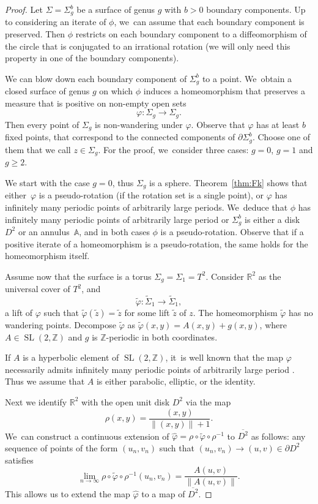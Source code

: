 \documentclass[JEP,XML,SOM,Unicode,NoEqCountersInSection,NoFloatCountersInSection,published]{cedram}
\DeclareMathOperator{\SL}{SL}
\theoremstyle{definition}
\begin{document}
\begin{proof}
Let $\Sigma=\Sigma_g^b$ be a surface of genus $g$ with $b>0$ boundary components. Up to considering an iterate of $\phi$, we~can assume that each boundary component is preserved. Then $\phi$ restricts on each boundary component to a diffeomorphism of the circle that is conjugated to an irrational rotation (we will only need this property in one of the boundary components).

We can blow down each boundary component of $\Sigma_g^b$ to a point. We~obtain a closed surface of genus $g$ on which $\phi$ induces a homeomorphism that preserves a measure that is positive on non-empty open sets
\[
\varphi: \Sigma_g \to \Sigma_g.
\]
Then every point of $\Sigma_g$ is non-wandering under $\varphi$.
Observe that $\varphi$ has at least $b$ fixed points, that correspond to the connected components of $\partial \Sigma_g^b$. Choose one of them that we call $z\in \Sigma_g$. For the proof, we~consider three cases: $g=0$, $g=1$ and $g\geq 2$.

We start with the case $g=0$, thus $\Sigma_g$ is a sphere. Theorem~\ref{thm:Fk} shows that either~$\varphi$ is a pseudo-rotation (if the rotation set is a single point), or $\varphi$ has infinitely many periodic points of arbitrarily large periods. We~deduce that $\phi$ has infinitely many periodic points of arbitrarily large period or $\Sigma_g^b$ is either a disk $D^2$ or an annulus~$\mathbb{A}$, and in both cases $\phi$ is a pseudo-rotation. Observe that if a positive iterate of a homeomorphism is a pseudo-rotation, the same holds for the homeomorphism itself.

Assume now that the surface is a torus $\Sigma_g=\Sigma_1=T^2$. Consider $\mathbb{R}^2$ as the universal cover of $T^2$, and
\[
\widetilde \varphi: \widetilde \Sigma_1 \to \widetilde \Sigma_1,
\]
a lift of $\varphi$ such that $\widetilde \varphi(\widetilde z)=\widetilde z$ for some lift $\widetilde z$ of $z$. The homeomorphism $\widetilde \varphi$ has no wandering points. Decompose $\widetilde \varphi$ as
$\widetilde \varphi(x,y)= A(x,y) + g(x,y)$,
where $A\in \SL(2,\mathbb{Z})$ and $g$ is $\mathbb{Z}$-periodic in both coordinates.

If $A$ is a hyperbolic element of $\SL(2,\mathbb{Z})$, it~is well known that the map $\varphi$ necessarily admits infinitely many periodic points of arbitrarily large period \cite{F0, Ha}. Thus we assume that $A$ is either parabolic, elliptic, or the identity.

Next we identify $\mathbb{R}^2$ with the open unit disk $D^2$ via the map
\[
\rho(x,y)=\frac{(x,y)}{\|(x,y)\|+1}.
\]
We~can construct a continuous extension of $\widehat \varphi= \rho\circ \widetilde \varphi \circ \rho^{-1}$ to $ \overline{D^2}$ as follows: any sequence of points of the form $(u_n,v_n)$ such that $ (u_n,v_n) \rightarrow (u,v) \in \partial D^2$ satisfies
\[
\lim_{n \to \infty} \rho \circ \widetilde \varphi \circ \rho^{-1} (u_n,v_n) = \frac{A(u,v)}{\|A(u,v)\|}.
\]
This allows us to extend the map $\widehat \varphi$ to a map of $\overline{D^2}$.


\end{proof}
\end{document}

